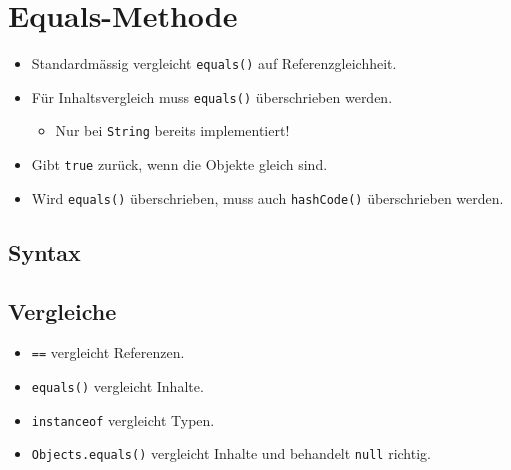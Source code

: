 \section{Equals-Methode}
\begin{itemize}
    \item Standardmässig vergleicht \lstinline{equals()} auf Referenzgleichheit.
    \item Für Inhaltsvergleich muss \lstinline{equals()} überschrieben werden.
    \begin{itemize}
        \item Nur bei \lstinline{String} bereits implementiert!
    \end{itemize}
    \item Gibt \lstinline{true} zurück, wenn die Objekte gleich sind.
    \item Wird \lstinline{equals()} überschrieben, muss auch \lstinline{hashCode()} überschrieben werden.
\end{itemize}


\begin{minipage}[t]{0.54\columnwidth}
    \subsection{Syntax}
    
    
\end{minipage}\hfill%
\begin{minipage}[t]{0.45\columnwidth}
    \subsection{Vergleiche}
    \begin{itemize}
        \item \lstinline{==} vergleicht Referenzen.
        \item \lstinline{equals()} vergleicht Inhalte.
        \item \lstinline{instanceof} vergleicht Typen.
        \item \lstinline{Objects.equals()} vergleicht Inhalte und behandelt \lstinline{null} richtig.
    \end{itemize}
\end{minipage}

